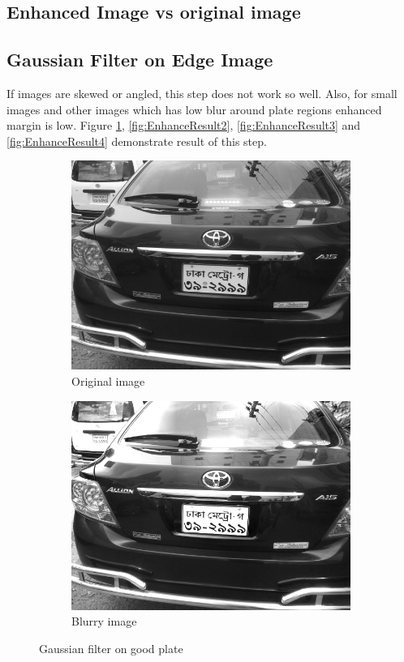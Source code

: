 \subsection{Enhanced Image vs original image}

\subsection{Gaussian Filter on Edge Image}
If images are skewed or angled, this step does not work so well. Also, for small images and other images which has low blur around plate regions enhanced margin is low. Figure \ref{fig:EnhanceResult1}, \ref{fig:EnhanceResult2}, \ref{fig:EnhanceResult3} and \ref{fig:EnhanceResult4} demonstrate result of this step.

\begin{figure}
\begin{subfigure}{0.5\textwidth}
    \centering
    \includegraphics[width=0.9\linewidth]{./img/experiment/stage.2/angle3}
    \caption{Original image}
\end{subfigure}
\begin{subfigure}{0.5\textwidth}
    \centering
    \includegraphics[width=0.9\linewidth]{./img/experiment/stage.5/angle3}
    \caption{Blurry image}
\end{subfigure}
\caption{Gaussian filter on good plate}
\label{fig:EnhanceResult1}
\end{figure}

